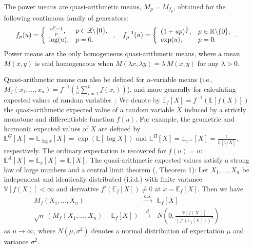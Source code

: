 \documentclass{article}
\def\bbR{\mathbb{R}}
\def\bbE{\mathbb{E}}
\def\bbV{\mathbb{V}}
\begin{document}
The power means  are quasi-arithmetic means, $M_p=M_{f_p}$, obtained for the following continuous family of generators:
$$
f_p(u)=
\left\{
\begin{array}{ll}
\frac{u^p-1}{p}, & p\in\bbR\backslash\{0\},\cr
\log(u), & p=0.
\end{array}
\right., \quad
f_p^{-1}(u)=
\left\{
\begin{array}{ll}
(1+up)^{\frac{1}{p}}, & p\in\bbR\backslash\{0\},\cr
\exp(u), & p=0.
\end{array}
\right..
$$
Power means are the only homogeneous quasi-arithmetic means, where a mean $M(x,y)$ is said homogeneous when $M(\lambda x,\lambda y)=\lambda\, M(x,y)$ for any $\lambda>0$.   

Quasi-arithmetic means can also be defined for $n$-variable means 
(i.e., {$M_f(x_1,\ldots,x_n)=f^{-1}(\frac{1}{n}\sum_{i=1}^n f(x_i))$}), and more generally for calculating expected values of random variables~\cite{de2016mean}: 
We denote by $\bbE_f[X]=f^{-1}(\bbE[f(X)])$ 
the quasi-arithmetic expected value of a random variable $X$ induced by a strictly monotone and differentiable function $f(u)$.
For example, the geometric and harmonic expected values of $X$ are defined  by
$\bbE^G[X]=\bbE_{\log x}[X]=\exp(\bbE[\log X])$ and $\bbE^H[X]=\bbE_{x^{-1}}[X]=\frac{1}{\bbE[1/X]}$, respectively.
The ordinary expectation is recovered for $f(u)=u$: {$\bbE^A[X]=\bbE_x[X]=\bbE[X]$}. 
The quasi-arithmetic expected values satisfy a  strong law of large numbers and a central limit theorem (\cite{de2016mean}, Theorem 1):
Let $X_1,\ldots, X_n$ be independent and identically distributed (i.i.d.) with finite variance $\bbV[f(X)]<\infty$ 
and derivative $f'(\bbE_f[X])\not =0$ at $x=\bbE_f[X]$.
Then we have 
\begin{eqnarray*}
M_f(X_1,\ldots, X_n) &\stackrel{a.s.}{\longrightarrow}& \bbE_f[X]\\
\sqrt{n} \, \left(M_f(X_1,\ldots, X_n)-\bbE_f[X]\right)  &\stackrel{d}{\longrightarrow}& N\left(0, \frac{\bbV[f(X)]}{\left(f'(\bbE_f[X])\right)^2} \right) 
\end{eqnarray*}
as $n\rightarrow\infty$, where $N(\mu,\sigma^2)$ denotes a normal distribution of expectation $\mu$ and variance $\sigma^2$.
\end{document}
